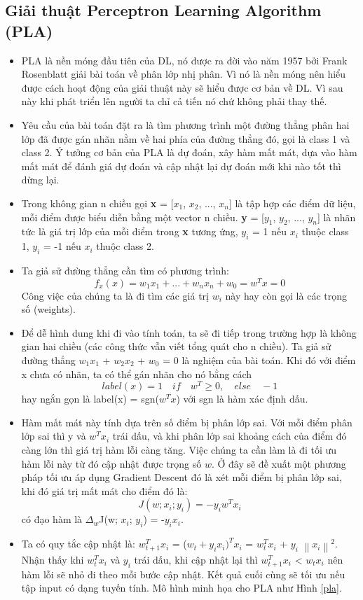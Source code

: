 \subsection{Giải thuật Perceptron Learning Algorithm (PLA)}
\begin{itemize}
\item PLA là nền móng đầu tiên của DL, nó được ra đời vào năm 1957 bởi Frank Rosenblatt giải bài toán về phân lớp nhị phân. Vì nó là nền móng nên hiểu được cách hoạt động của giải thuật này sẽ hiểu được cơ bản về DL. Vì sau này khi phát triển lên người ta chỉ cả tiến nó chứ không phải thay thế.
\item Yêu cầu của bài toán đặt ra là tìm phương trình một đường thẳng phân hai lớp đã được gán nhãn nằm về hai phía của đường thẳng đó, gọi là class 1 và class 2. Ý tưởng cơ bản của PLA là dự đoán, xây hàm mất mát, dựa vào hàm mất mát để đánh giá dự đoán và cập nhật lại dự đoán mới khi nào tốt thì dừng lại.
\item Trong không gian n chiều gọi \textbf{x} = [$x_{1}$, $x_{2}$, ..., $x_{n}$] là tập hợp các điểm dữ liệu, mỗi điểm được biểu diễn bằng một vector n chiều. \textbf{y} = [$y_{1}$, $y_{2}$, ..., $y_{n}$] là nhãn tức là giá trị lớp của mỗi điểm trong \textbf{x} tương ứng, $y_{i}$ = 1 nếu $x_{i}$ thuộc class 1, $y_{i}$ = -1 nếu $x_{i}$ thuộc class 2.
\item Ta giả sử đường thẳng cần tìm có phương trình:\[f_{x}(x) = w_{1}x_{1}+...+w_{n}x_{n}+w_{0}=w^{T}x = 0\]
Công việc của chúng ta là đi tìm các giá trị $w_{i}$ này hay còn gọi là các trọng số (weights).
\item Để dễ hình dung khi đi vào tính toán, ta sẽ đi tiếp trong trường hợp là không gian hai chiều (các công thức vẫn viết tổng quát cho n chiều). Ta giả sử đường thẳng $w_{1}$$x_{1}$ + $w_{2}$$x_{2}$ + $w_{0}$ = 0 là nghiệm của bài toán. Khi đó với điểm x chưa có nhãn, ta có thể gán nhãn cho nó bằng cách  \[label(x) = 1 \quad if \quad w^T \geq 0, \quad else \quad -1\] hay ngắn gọn là label(x) = sgn($w^{T}x$) với sgn là hàm xác định dấu.
\item Hàm mất mát này tính dựa trên số điểm bị phân lớp sai. Với mỗi điểm phân lớp sai thì y và $w^{T}$$x_{i}$ trái dấu, và khi phân lớp sai khoảng cách của điểm đó càng lớn thì giá trị hàm lỗi càng tăng. Việc chúng ta cần làm là đi tối ưu hàm lỗi này từ đó cập nhật được trọng số $w$. Ở đây sẽ đề xuất một phương pháp tối ưu áp dụng Gradient Descent đó là xét mỗi điểm bị phân lớp sai, khi đó giá trị mất mát cho điểm đó là: \[J(w; x_i; y_i) = -y_i w^T x_i\] có đạo hàm là $\Delta _{w}$J(w; $x_{i}$; $y_{i}$) = -$y_{i}$$x_{i}$.
\item Ta có quy tắc cập nhật là: $w_{t+1}^{T}$$x_{i}$ = ($w_{t}+y_{i} x_{i} )^{T}$$x_{i}$ =  $w_{t}^{T}$$x_{i}$ + $y_{i}$ $\left \| x_i \right \| ^{2}$.
Nhận thấy khi $w_{t}^T$$x_{i}$ và $y_{i}$ trái dấu, khi cập nhật lại thì $w_{t+1}^Tx_{i}$ < $w_{t}x_{i}$ nên hàm lỗi sẽ nhỏ đi theo mỗi bước cập nhật. Kết quả cuối cùng sẽ tối ưu nếu tập input có dạng tuyến tính. Mô hình minh họa cho PLA như Hình \ref{pla}. 
\end{itemize}

